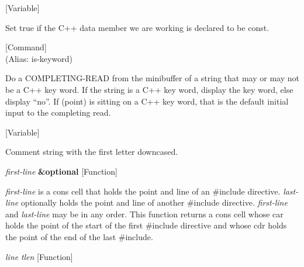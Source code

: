 \vspace{1em}
\noindent
{}
\usebox{\funcname}
 \hfill [Variable]

\begin{doc-string}
Set true if the C++ data member we are working is declared to be const.
\end{doc-string}

\vspace{1em}
\noindent
{}
\usebox{\funcname}
 \hfill [Command]\\%
 (Alias: is-keyword)

\begin{doc-string}
Do a COMPLETING-READ from the minibuffer of a string that may or may not be a
C++ key word.  If the string is a C++ key word, display the key word, else
display ``no''.  If (point) is sitting on a C++ key word, that is the default
initial input to the completing read.
\end{doc-string}

\vspace{1em}
\noindent
{}
\usebox{\funcname}
 \hfill [Variable]

\begin{doc-string}
Comment string with the first letter downcased.
\end{doc-string}

\vspace{1em}
\noindent
{}
\usebox{\funcname}\emph{first-line} \textbf{\&optional}
 \hfill [Function]
\hspace*{\wd\funcname}

\begin{doc-string}
\emph{first-line} is a cons cell that holds the point and line of an \#include
directive.  \emph{last-line} optionally holds the point and line of another \#include
directive.  \emph{first-line} and \emph{last-line} may be in any order.  This function returns
a cons cell whose car holds the point of the start of the first \#include
directive and whose cdr holds the point of the end of the last \#include.
\end{doc-string}

\vspace{1em}
\noindent
{}
\usebox{\funcname}\emph{line} \emph{tlen}
 \hfill [Function]

